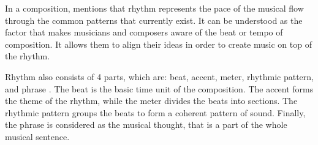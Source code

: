 In a composition, \citet{rivadelo1986fundamentals} mentions that rhythm represents the pace of the musical flow through the common patterns that currently exist. It can be understood as the factor that makes musicians and composers aware of the beat or tempo of composition. It allows them to align their ideas in order to create music on top of the rhythm. 

Rhythm also consists of 4 parts, which are: beat, accent, meter, rhythmic pattern, and phrase \citep{rivadelo1986fundamentals}. The beat is the basic time unit of the composition. The accent forms the theme of the rhythm, while the meter divides the beats into sections. The rhythmic pattern groups the beats to form a coherent pattern of sound. Finally, the phrase is considered as the musical thought, that is a part of the whole musical sentence.




        
